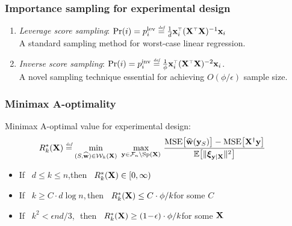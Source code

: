 \documentclass{beamer}
\begin{document}
\begin{frame}
  \frametitle{Importance sampling for experimental design}
  \begin{enumerate}
  \item  \textit{Leverage score sampling}: $\Pr(i)=p_i^{\mathrm{lev}}
\defeq \frac1d \x_i^\top(\X^\top\X)^{-1}\x_i$\\
{\footnotesize A standard sampling method for worst-case linear regression.}
\pause
\vspace{5mm}

  \item \textit{Inverse score sampling}: $\Pr(i)= p_i^{\mathrm{inv}}\defeq
    \frac1\phi\x_i^\top(\X^\top\X)^{-2}\x_i$.\\
{\footnotesize  A novel sampling technique essential
    for achieving $O(\phi/\epsilon)$ sample size.}
  \end{enumerate}
\end{frame}

\begin{frame}
  \frametitle{Minimax A-optimality}
  \begin{definition}
    Minimax A-optimal value for experimental design:
\begin{align*}
R_k^*(\X)&\defeq 
  \min_{(S,\wbh)\in\Wc_k(\X)}\ \max_{\y\in\Fc_n\backslash\mathrm{Sp}(\X)}\,\frac{\mathrm{MSE}\big[\wbh(\y_S)\big]-
     \mathrm{MSE}\big[\X^\dagger\y\big]
  }{\E\big[\|\xib_{\y|\X}\|^2\big]}
\end{align*}
\end{definition}
\pause
\begin{itemize}
\item If \ $d\leq k\leq n$,\qquad\quad then \
  $R_k^*(\mathbf X)\in[0,\infty)$
    \pause
\item If \ $k\geq C\cdot d\log n$,\quad \,then \ $R_k^*(\mathbf X)\leq
  C\cdot\phi/k$\hfill for some $C$
\pause
\item If \ $k^2<\epsilon nd/3$,\qquad\ \,then \ $R_k^*(\mathbf X)\geq
    (1\!-\!\epsilon)\cdot\phi/k$\hfill for some $\mathbf X$
\end{itemize}
\end{frame}
\end{document}

